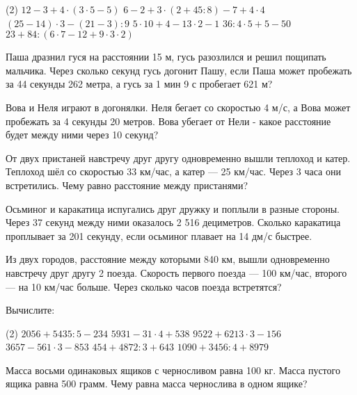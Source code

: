 \begin{class}[number=8]
	\begin{listofex}
		\item \begin{tasks}(2)
			\task \( 12-3+4\cdot(3\cdot5-5) \)
			\task \( 6-2+3\cdot(2+45:8)-7+4\cdot4 \)
			\task \( (25-14)\cdot3-(21-3):9 \)
			\task \( 5\cdot10+4-13\cdot2-1 \)
			\task \( 36:4\cdot5+5-50 \)
			\task \( 23+84:(6\cdot7-12+9\cdot3\cdot2) \)
		\end{tasks}
		\item Паша дразнил гуся на расстоянии 15 м, гусь разозлился и решил пощипать мальчика. Через сколько секунд гусь догонит Пашу, если Паша может пробежать за 44 секунды 262 метра, а гусь за 1 мин 9 с пробегает 621 м?
		\item Вова и Неля играют в догонялки. Неля бегает со скоростью 
		4 м/с, а Вова может пробежать за 4 секунды 20 метров. Вова убегает от Нели - какое расстояние будет между ними 
		через 10 секунд?
		\item От двух пристаней навстречу друг другу одновременно вышли теплоход и катер. Теплоход шёл со скоростью 33 км/час, а катер --- 25 км/час. Через 3 часа они встретились. Чему равно расстояние между пристанями?
		\item Осьминог и каракатица испугались друг дружку и поплыли в разные стороны. Через 37 секунд между ними оказалось 2 516 дециметров. Сколько каракатица проплывает за 201 секунду, если осьминог плавает на 14 дм/с быстрее.
		\item  Из двух городов, расстояние между которыми 840 км, вышли одновременно навстречу друг другу 2 поезда. Скорость первого поезда --- 100 км/час, второго --- на 10 км/час больше. Через сколько часов поезда встретятся?
	\end{listofex}
\end{class}

\begin{homework}[number=4]
	\begin{listofex}
		\item Вычислите:
		\begin{tasks}(2)
			\task \( 2056 + 5435 : 5 - 234 \)
			\task \( 5931 - 31\cdot 4 + 538 \)
			\task \( 9522 + 6213\cdot 3 - 156 \)
			\task \( 3657 - 561 \cdot 3 - 853 \)
			\task \( 454 + 4872 : 3 + 643 \)
			\task \( 1090 + 3456: 4 + 8979 \)
		\end{tasks}
		\item Масса восьми одинаковых ящиков с черносливом равна 100 кг. Масса пустого ящика равна 500 грамм. Чему равна масса чернослива в одном ящике?
	\end{listofex}
\end{homework}
